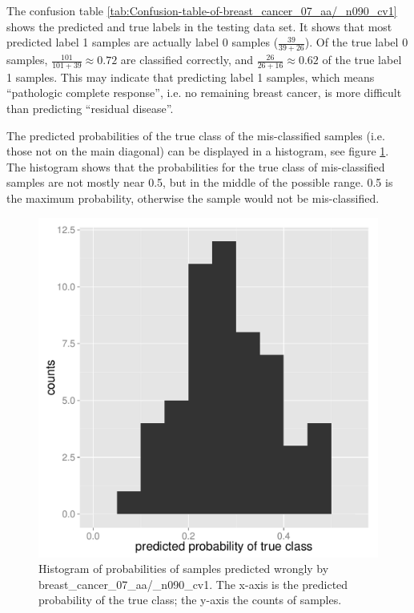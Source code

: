 The confusion table \ref{tab:Confusion-table-of-breast_cancer_07_aa/_n090_cv1}
shows the predicted and true labels in the testing data set. It shows
that most predicted label 1 samples are actually label 0 samples ($\frac{39}{39+26}$).
Of the true label 0 samples, $\frac{101}{101+39}\approx0.72$ are
classified correctly, and $\frac{26}{26+16}\approx0.62$ of the true
label 1 samples. This may indicate that predicting label 1 samples,
which means ``pathologic complete response'', i.e. no remaining
breast cancer, is more difficult than predicting ``residual disease''.

The predicted probabilities of the true class of the mis-classified
samples (i.e. those not on the main diagonal) can be displayed in
a histogram, see figure \ref{fig:Histogram-of-probabilities-of-breast_cancer_07}.
The histogram shows that the probabilities for the true class of mis-classified
samples are not mostly near 0.5, but in the middle of the possible
range. 0.5 is the maximum probability, otherwise the sample would
not be mis-classified.

\begin{figure}
\begin{centering}
\includegraphics[width=0.68\columnwidth]{images/breast_cancer_07-true-label-probabilities-of-misclassified-samples.pdf}
\par\end{centering}
\caption[Histogram of probabilities of samples predicted wrongly.]{\label{fig:Histogram-of-probabilities-of-breast_cancer_07}Histogram
of probabilities of samples predicted wrongly by breast\_cancer\_07\_aa/\_n090\_cv1.
The x-axis is the predicted probability of the true class; the y-axis
the counts of samples.}
\end{figure}

